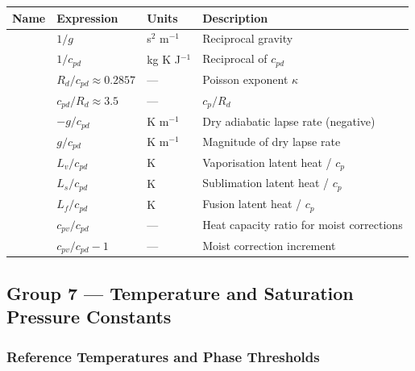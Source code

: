 \begin{longtable}{L{3cm} L{4.5cm} L{2cm} L{5cm}}
  \toprule
  \textbf{Name} & \textbf{Expression} & \textbf{Units} & \textbf{Description} \\
  \midrule
  \endhead
  \bottomrule
  \endfoot
     & $1/g$                    & s$^2$ m$^{-1}$  & Reciprocal gravity \\
       & $1/c_{pd}$               & kg K J$^{-1}$   & Reciprocal of $c_{pd}$ \\
      & $R_d/c_{pd}\approx0.2857$& ---             & Poisson exponent $\kappa$ \\
      & $c_{pd}/R_d\approx3.5$   & ---             & $c_p/R_d$ \\
       & $-g/c_{pd}$              & K m$^{-1}$      & Dry adiabatic lapse rate (negative) \\
      & $g/c_{pd}$               & K m$^{-1}$      & Magnitude of dry lapse rate \\
    & $L_v/c_{pd}$             & K               & Vaporisation latent heat / $c_p$ \\
    & $L_s/c_{pd}$             & K               & Sublimation latent heat / $c_p$ \\
    & $L_f/c_{pd}$             & K               & Fusion latent heat / $c_p$ \\
    & $c_{pv}/c_{pd}$          & ---             & Heat capacity ratio for moist corrections \\
      & $c_{pv}/c_{pd}-1$        & ---             & Moist correction increment \\
\end{longtable}

\subsection{Group 7 --- Temperature and Saturation Pressure Constants}

\subsubsection{Reference Temperatures and Phase Thresholds}

